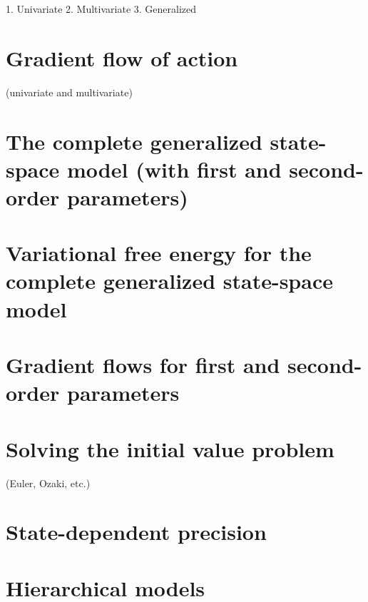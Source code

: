    1. Univariate
   2. Multivariate
   3. Generalized

\section{Gradient flow of action} 

(univariate and multivariate)

\section{The complete generalized state-space model (with first and second-order parameters)}

\section{Variational free energy for the complete generalized state-space model}
\section{Gradient flows for first and second-order parameters}
\section{Solving the initial value problem} 

(Euler, Ozaki, etc.)

\section{State-dependent precision}
\section{Hierarchical models}